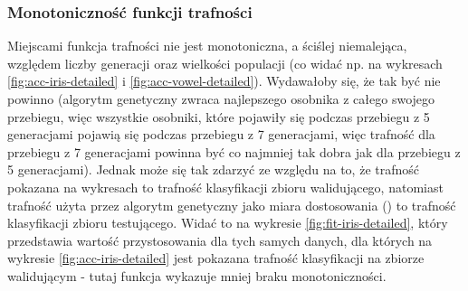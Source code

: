 %	
%	
%	

\FloatBarrier
	\subsubsection{Monotoniczność funkcji trafności}	
	Miejscami funkcja trafności nie jest monotoniczna, a ściślej niemalejąca, względem liczby generacji oraz wielkości populacji (co widać np. na wykresach \ref{fig:acc-iris-detailed} i \ref{fig:acc-vowel-detailed}). Wydawałoby się, że tak być nie powinno (algorytm genetyczny zwraca najlepszego osobnika z całego swojego przebiegu, więc wszystkie osobniki, które pojawiły się podczas przebiegu z 5 generacjami pojawią się podczas przebiegu z 7 generacjami, więc trafność dla przebiegu z 7 generacjami powinna być co najmniej tak dobra jak dla przebiegu z 5 generacjami). Jednak może się tak zdarzyć ze względu na to, że trafność pokazana na wykresach to trafność klasyfikacji zbioru walidującego, natomiast trafność użyta przez algorytm genetyczny jako miara dostosowania () to trafność klasyfikacji zbioru testującego. Widać to na wykresie \ref{fig:fit-iris-detailed}, który przedstawia wartość przystosowania dla tych samych danych, dla których na wykresie \ref{fig:acc-iris-detailed} jest pokazana trafność klasyfikacji na zbiorze walidującym - tutaj funkcja wykazuje mniej braku monotoniczności. 

